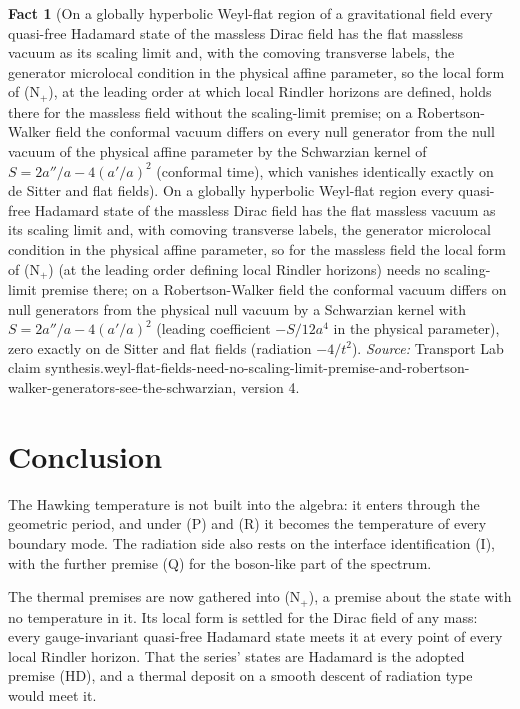 \documentclass[11pt]{article}
\theoremstyle{definition}
\newtheorem{fact}[theorem]{Fact}
\theoremstyle{plain}
\begin{document}
\begin{fact}[On a globally hyperbolic Weyl-flat region of a gravitational field every quasi-free Hadamard state of the massless Dirac field has the flat massless vacuum as its scaling limit and, with the comoving transverse labels, the generator microlocal condition in the physical affine parameter, so the local form of (N$_{+}$), at the leading order at which local Rindler horizons are defined, holds there for the massless field without the scaling-limit premise; on a Robertson-Walker field the conformal vacuum differs on every null generator from the null vacuum of the physical affine parameter by the Schwarzian kernel of $S = 2a''/a - 4(a'/a)^{2}$ (conformal time), which vanishes identically exactly on de Sitter and flat fields]\label{c:synthesis.weyl-flat-fields-need-no-scaling-limit-premise-and-robertson-walker-generators-see-the-schwarzian}
On a globally hyperbolic Weyl-flat region every quasi-free Hadamard state of the massless Dirac field has the flat massless vacuum as its scaling limit and, with comoving transverse labels, the generator microlocal condition in the physical affine parameter, so for the massless field the local form of (N$_{+}$) (at the leading order defining local Rindler horizons) needs no scaling-limit premise there; on a Robertson-Walker field the conformal vacuum differs on null generators from the physical null vacuum by a Schwarzian kernel with $S = 2a''/a - 4(a'/a)^{2}$ (leading coefficient $-S/12a^{4}$ in the physical parameter), zero exactly on de Sitter and flat fields (radiation $-4/t^{2}$).
\emph{Source:} Transport Lab claim synthesis.weyl-flat-fields-need-no-scaling-limit-premise-and-robertson-walker-generators-see-the-schwarzian, version 4.
\end{fact}

\section*{Conclusion}
The Hawking temperature is not built into the algebra: it enters through the geometric period, and under (P) and (R) it becomes the temperature of every boundary mode. The radiation side also rests on the interface identification (I), with the further premise (Q) for the boson-like part of the spectrum.

The thermal premises are now gathered into (N$_{+}$), a premise about the state with no temperature in it. Its local form is settled for the Dirac field of any mass: every gauge-invariant quasi-free Hadamard state meets it at every point of every local Rindler horizon. That the series' states are Hadamard is the adopted premise (HD), and a thermal deposit on a smooth descent of radiation type would meet it.
\end{document}
